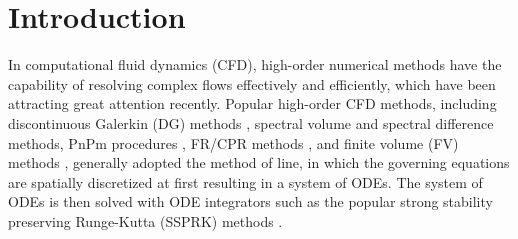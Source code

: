 
\section{Introduction}
\label{sec:intro}

In computational fluid dynamics (CFD),
high-order numerical methods have the capability of
resolving complex flows effectively and efficiently,
which have been attracting great attention recently.
Popular high-order CFD methods, including discontinuous
Galerkin (DG) methods
\cite{reed1973triangularDG,
    BASSI1997251DG,
    BASSI1997267DG,
    cockburn1989DGII,
    cockburn2001rungeDG},
spectral volume
\cite{WANG2002210_SV}
and spectral difference
\cite{LIU2006780_SD} methods,
PnPm procedures
\cite{DUMBSER20088209_PNPM},
FR/CPR methods
\cite{huynh2007flux_FR,
    huynh2009reconstruction_FR,
    vincent2011new_FR,
    wang2009unifying_CPR},
and finite volume (FV) methods
\cite{wang2016compact_VR,
    wang2016compact1_VR,
    wang2017compact_VR,
    pan2018high_VR,
    zhang2019compact_VR,
    barth1990higher_FV,
    delanaye1999quadratic_FV,
    ollivier1997quasi_ENO,
    friedrich1998weighted_WENO,
    hu1999weighted_WENO,
    dumbser2007quadrature_WENO},
generally adopted the method of line,
in which the governing equations 
are spatially discretized at first
resulting in a system of ODEs.
The system of ODEs is then 
solved with
ODE integrators such as the 
popular strong stability preserving
Runge-Kutta (SSPRK) methods
\cite{gottlieb2001strong_SSPRK}.

